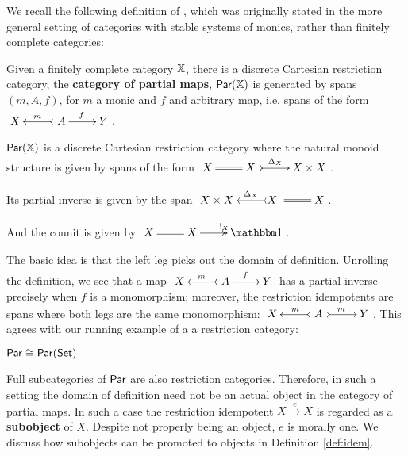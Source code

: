 \begin{theorem}
%
\end{theorem}
We recall the following definition of \cite[\S 3]{cockett}, which was originally stated in the more general setting of categories with stable systems of monics, rather than finitely complete categories:
\begin{definition}
\label{def:par}
Given a finitely complete category $\mathbb{X}$,  there is a discrete Cartesian restriction category, the {\bf category of partial maps}, $\mathsf{Par}(\mathbb{X})$ is generated by spans $(m,A,f)$, for $m$ a monic and $f$ and arbitrary map, i.e. spans of the form
$
\xymatrix{
X 
&
\ A \ar@{>->}[l]_m \ar[r]^{f}
&
Y
}
$.

 $\mathsf{Par}(\mathbb{X})$ is a discrete Cartesian restriction category where the natural monoid structure is given by spans of the form 
$
\xymatrix{
X 
&
X \ \ar@{=}[l] \ar@{>->}[r]^{\Delta_X \ \ \ }
&
X\times X
}
$.


Its partial inverse is given by the span  
$
\xymatrix{
X \times X
&
X \ \ar@{=}[r] \ar@{>->}[l]_{\ \ \ \Delta_X}
&
X
}
$.

And the counit is given by 
$
\xymatrix{
X 
&
X \ar@{=}[l] \ar@{->>}[r]^{!_X}
&
\one
}
$.
\end{definition}
The basic idea is that the left leg picks out the domain of definition.  
Unrolling the definition, we see that a map
$
\xymatrix{
X 
&
\ A  \ar@{>->}[l]_m \ar[r]^{f}
&
Y
}
$ 
has a partial inverse precisely when $f$ is a monomorphism; moreover, the restriction idempotents are spans where both legs are the same monomorphism:
$
\xymatrix{
X 
&
\ A\  \ar@{>->}[l]_m \ar@{>->}[r]^{m}
&
Y
}
$.
This agrees with our running example of a a restriction category:
\begin{example}
$\mathsf{Par}\cong\mathsf{Par}(\mathsf{Set})$
\end{example}
Full subcategories of $\mathsf{Par}$ are also restriction categories.  Therefore, in such a setting the domain of definition need not be an actual object in the category of partial maps.  In such a case the restriction idempotent $X\xrightarrow{e}X$ is regarded as a {\bf subobject} of $X$.  Despite not properly being an object, $e$ is morally one.  We discuss how subobjects can be promoted to objects in Definition \ref{def:idem}.


